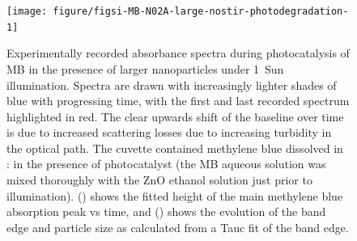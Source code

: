 \documentclass[9pt,twoside,twocolumn]{article}\usepackage{knitr}
\begin{document}
\begin{refsection}
\begin{figure}[tbp]
\centering
\begin{knitrout}\footnotesize
{}\color{fgcolor}

{\centering \texttt{[image: figure/figsi-MB-N02A-large-nostir-photodegradation-1]} 

}


\end{knitrout}
{\label{figsi-a:MB-N02A-large-nostir-photodegradation}}
{\label{figsi-b:MB-N02A-large-nostir-photodegradation}}
\caption{Experimentally recorded absorbance spectra during photocatalysis of MB in the presence of larger  nanoparticles under 1~Sun illumination. Spectra are drawn with increasingly lighter shades of blue with progressing time, with the first and last recorded spectrum highlighted in red. The clear upwards shift of the baseline over time is due to increased scattering losses due to increasing turbidity in the optical path.
The cuvette contained methylene blue dissolved in : in the presence of  photocatalyst (the MB aqueous solution was mixed thoroughly with the ZnO ethanol solution just prior to illumination).
() shows the fitted height of the main methylene blue absorption peak vs time, and () shows the evolution of the  band edge and particle size as calculated from a Tauc fit of the band edge.}
\label{figsi:MB-N02A-large-nostir-photodegradation}
\end{figure}

\footnotesize{\printbibliography[title={References in SI}]}

\end{refsection}
\end{document}
